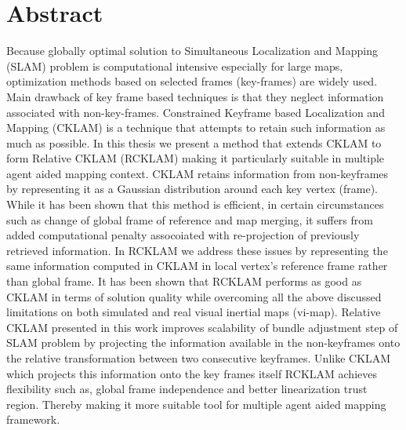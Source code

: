 \chapter*{Abstract}

Because globally optimal solution to Simultaneous Localization and Mapping (SLAM) problem is computational intensive especially for large maps, optimization methods based on selected frames (key-frames) are widely used. Main drawback of key frame based techniques is that they neglect information associated with non-key-frames. Constrained Keyframe based Localization and Mapping (CKLAM) is a technique that attempts to retain such information as much as possible. In this thesis we present a method that extends CKLAM to form Relative CKLAM (RCKLAM) making it particularly suitable in multiple agent aided mapping context. CKLAM retains information from non-keyframes by representing it as a Gaussian distribution around each key vertex (frame). While it has been shown that this method is efficient, in certain circumstances such as change of global frame of reference and map merging, it suffers from added computational penalty assocoiated with re-projection of previously retrieved information. In RCKLAM we address these issues by representing the same information computed in CKLAM in local vertex's reference frame rather than global frame. It has been shown that RCKLAM performs as good as CKLAM in terms of solution quality while overcoming all the above discussed limitations on both simulated and real visual inertial maps (vi-map). Relative CKLAM presented in this work improves scalability of bundle adjustment step of SLAM problem by projecting the information available in the non-keyframes onto the relative transformation between two consecutive keyframes. Unlike CKLAM which projects this information onto the key frames itself RCKLAM achieves flexibility such as, global frame independence and better linearization trust region. Thereby making it more suitable tool for multiple agent aided mapping framework.